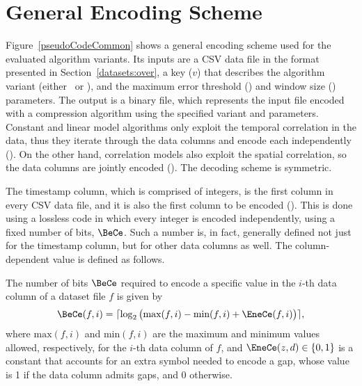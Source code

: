 

\vspace{-20pt}
\section{General Encoding Scheme}
\label{algo:details}


\vspace{-5pt}
Figure~\ref{pseudoCodeCommon} shows a general encoding scheme used for the evaluated algorithm variants. Its inputs are a CSV data file in the format presented in Section~\ref{datasets:over}, a key ($v$) that describes the algorithm variant (either \maskalgo\ or \NOmaskalgo), and the maximum error threshold (\maxerror) and window size (\win) parameters. The output is a binary file, which represents the input file encoded with a compression algorithm using the specified variant and parameters. Constant and linear model algorithms only exploit the temporal correlation in the data, thus they iterate through the data columns and encode each independently (). On the other hand, correlation models also exploit the spatial correlation, so the data columns are jointly encoded (). The decoding scheme is symmetric.





\clearpage


The timestamp column, which is comprised of integers, is the first column in every CSV data file, and it is also the first column to be encoded (). This is done using a lossless code in which every integer is encoded independently, using a fixed number of bits, $\BeCe$. Such a number is, in fact, generally defined not just for the timestamp column, but for other data columns as well. The column-dependent value is defined as follows.


\begin{defcion}
The number of bits $\BeCe$ required to encode a specific value in the $i$-th data column of a dataset file $f$ is given by
\vspace{-5pt}
\begin{equation}
\label{eq:bece}
\BeCe(f, i) = \lceil{ \log_2 \big( \text{max}(f, i) - \text{min}(f, i) + \EneCe(f, i) \big) } \rceil,
\end{equation}
where $\text{max}(f, i)$ and $\text{min}(f, i)$ are the maximum and minimum values allowed, respectively, for the $i$-th data column of $f$, and $\EneCe(z, d)\in \{0,1\}$ is a constant that accounts for an extra symbol needed to encode a gap, whose value is 1 if the data column admits gaps, and 0 otherwise.
\end{defcion}


